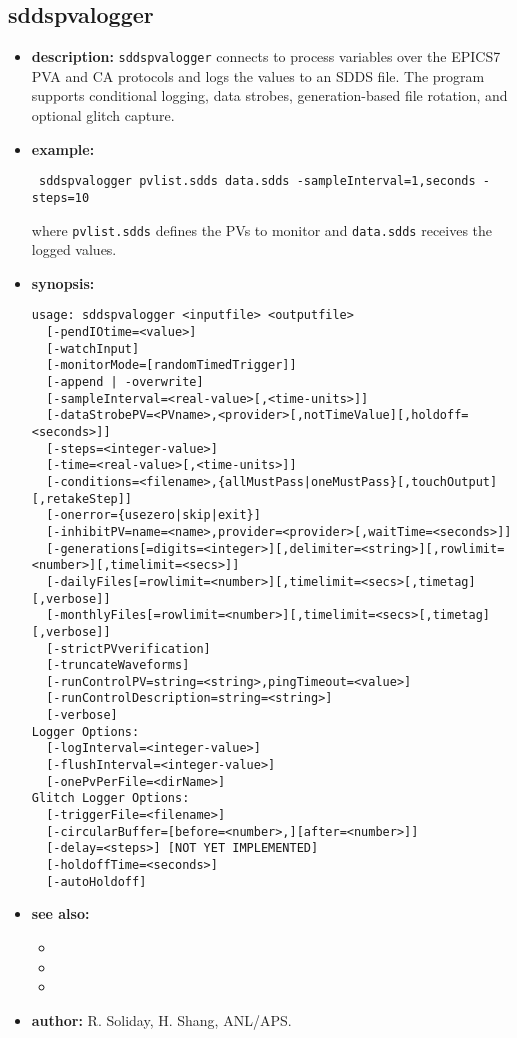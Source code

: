 \begin{latexonly}
\newpage
\end{latexonly}

\subsection{sddspvalogger}
\label{sddspvalogger}

\begin{itemize}
\item {\bf description:}
\verb+sddspvalogger+ connects to process variables over the EPICS7 PVA and CA protocols and logs the values to an SDDS file. The program supports conditional logging, data strobes, generation-based file rotation, and optional glitch capture.
\item {\bf example:}
\begin{flushleft}{\tt
sddspvalogger pvlist.sdds data.sdds -sampleInterval=1,seconds -steps=10\\
}\end{flushleft}
where {\tt pvlist.sdds} defines the PVs to monitor and {\tt data.sdds} receives the logged values.
\item {\bf synopsis:}
\begin{verbatim}
usage: sddspvalogger <inputfile> <outputfile>
  [-pendIOtime=<value>]
  [-watchInput]
  [-monitorMode=[randomTimedTrigger]]
  [-append | -overwrite]
  [-sampleInterval=<real-value>[,<time-units>]]
  [-dataStrobePV=<PVname>,<provider>[,notTimeValue][,holdoff=<seconds>]]
  [-steps=<integer-value>]
  [-time=<real-value>[,<time-units>]]
  [-conditions=<filename>,{allMustPass|oneMustPass}[,touchOutput][,retakeStep]]
  [-onerror={usezero|skip|exit}]
  [-inhibitPV=name=<name>,provider=<provider>[,waitTime=<seconds>]]
  [-generations[=digits=<integer>][,delimiter=<string>][,rowlimit=<number>][,timelimit=<secs>]]
  [-dailyFiles[=rowlimit=<number>][,timelimit=<secs>[,timetag][,verbose]]
  [-monthlyFiles[=rowlimit=<number>][,timelimit=<secs>[,timetag][,verbose]]
  [-strictPVverification]
  [-truncateWaveforms]
  [-runControlPV=string=<string>,pingTimeout=<value>]
  [-runControlDescription=string=<string>]
  [-verbose]
Logger Options:
  [-logInterval=<integer-value>]
  [-flushInterval=<integer-value>]
  [-onePvPerFile=<dirName>]
Glitch Logger Options:
  [-triggerFile=<filename>]
  [-circularBuffer=[before=<number>,][after=<number>]]
  [-delay=<steps>] [NOT YET IMPLEMENTED]
  [-holdoffTime=<seconds>]
  [-autoHoldoff]
\end{verbatim}
\item {\bf see also:}
  \begin{itemize}
  \item {}
  \item {}
  \item {}
  \end{itemize}
\item {\bf author:} R. Soliday, H. Shang, ANL/APS.
\end{itemize}
